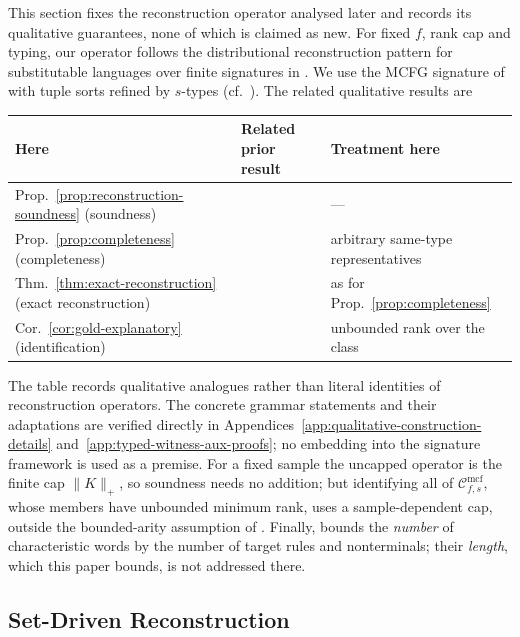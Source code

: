 \documentclass[11pt]{article}
\numberwithin{equation}{section}
\theoremstyle{plain}
\theoremstyle{definition}
\theoremstyle{remark}
\newcommand{\Cmcf}[2]{\mathcal{C}^{\mathrm{mcf}}_{#1,#2}}
\begin{document}
This section fixes the reconstruction operator analysed later and records
its qualitative guarantees, none of which is claimed as new.
For fixed $f$, rank cap and typing, our operator follows the
distributional reconstruction pattern for substitutable languages over finite
signatures in \cite{Yoshinaka2015General}.  We use the MCFG signature of
\cite[Example~3]{Yoshinaka2015General} with tuple sorts refined by $s$-types
(cf.\ \cite[Section~8]{Yoshinaka2015General}).  The related qualitative
results are
\begin{center}
\footnotesize
\begin{tabular}{@{}lll@{}}
\hline
Here & Related prior result & Treatment here\\
\hline
Prop.~\ref{prop:reconstruction-soundness} (soundness) & \cite[Lemma~2]{Yoshinaka2015General} & ---\\
Prop.~\ref{prop:completeness} (completeness) & \cite[Lemma~3]{Yoshinaka2015General} & arbitrary same-type representatives\\
Thm.~\ref{thm:exact-reconstruction} (exact reconstruction) & \cite[Lemmas~2--3]{Yoshinaka2015General} & as for Prop.~\ref{prop:completeness}\\
Cor.~\ref{cor:gold-explanatory} (identification) & \cite[Theorem~1]{Yoshinaka2015General} & unbounded rank over the class\\
\hline
\end{tabular}
\end{center}
The table records qualitative analogues rather than literal identities
of reconstruction operators.  The concrete grammar statements and their
adaptations are verified directly in
Appendices~\ref{app:qualitative-construction-details}
and~\ref{app:typed-witness-aux-proofs}; no embedding into the signature
framework is used as a premise.  For a fixed sample the uncapped operator
is the finite cap $\|K\|_+$, so soundness needs no addition; but identifying
all of $\Cmcf{f}{s}$, whose members have unbounded minimum rank, uses a
sample-dependent cap, outside the bounded-arity assumption of
\cite{Yoshinaka2015General}.  Finally,
\cite{Yoshinaka2015General} bounds the \emph{number} of characteristic words
by the number of target rules and nonterminals; their \emph{length}, which
this paper bounds, is not addressed there.

\subsection{Set-Driven Reconstruction}
\end{document}
